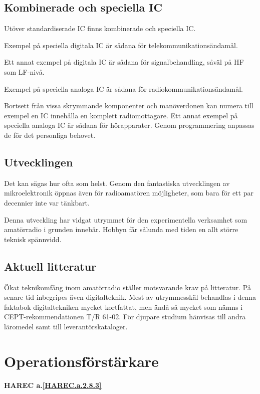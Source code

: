 \subsection{Kombinerade och speciella IC}

Utöver standardiserade IC finns kombinerade och speciella IC.

Exempel på speciella digitala IC är sådana för telekommunikationsändamål.

Ett annat exempel på digitala IC är sådana för signalbehandling, såväl på HF som
LF-nivå.

Exempel på speciella analoga IC är sådana för radiokommunikationsändamål.

Bortsett från vissa skrymmande komponenter och manöverdonen kan numera till exempel en
IC innehålla en komplett radiomottagare. Ett annat exempel på speciella analoga
IC är sådana för hörapparater. Genom programmering anpassas de för det
personliga behovet.

\subsection{Utvecklingen}

Det kan sägas hur ofta som helst. Genom den fantastiska utvecklingen av
mikroelektronik öppnas även för radioamatören möjligheter, som bara för ett par
decennier inte var tänkbart.

Denna utveckling har vidgat utrymmet för den experimentella verksamhet som
amatörradio i grunden innebär. Hobbyn får sålunda med tiden en allt större
teknisk spännvidd.

\subsection{Aktuell litteratur}

Ökat teknikomfång inom amatörradio ställer motsvarande krav på litteratur. På
senare tid inbegripes även digitalteknik. Mest av utrymmesskäl behandlas i denna
faktabok digitaltekniken mycket kortfattat, men ändå så mycket som nämns i
CEPT-rekommendationen T/R 61-02. För djupare studium hänvisas till andra
läromedel samt till leverantörskataloger.

\section{Operationsförstärkare}
\textbf{
HAREC a.\ref{HAREC.a.2.8.3}\label{myHAREC.a.2.8.3}
}

